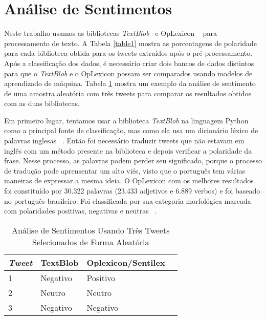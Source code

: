 \section{Análise de Sentimentos}

Neste trabalho usamos as bibliotecas \textit{TextBlob} ~\cite{textblob}e OpLexicon
~\cite{souza} para processamento de texto. A Tabela \ref{table1} mostra as
porcentagens de polaridade para cada biblioteca obtida para
os tweets extraídos após o pré-processamento.
Após a classificação dos dados, é necessário criar dois
bancos de dados distintos para que o \textit{TextBlob} e o OpLexicon
possam ser comparados usando modelos de aprendizado de
máquina. Tabela \ref{table2} mostra um exemplo da análise de sentimento
de uma amostra aleatória com três tweets para comparar
os resultados obtidos com as duas bibliotecas.


Em primeiro lugar, tentamos usar a biblioteca \textit{TextBlob} na
linguagem Python como a principal fonte de classificação,
mas como ela usa um dicionário léxico de palavras inglesas
~\cite{miller1995wordnet}. Então foi necessário traduzir tweets que não estavam em
inglês com um método presente na biblioteca e depois verificar
a polaridade da frase. Nesse processo, as palavras podem
perder seu significado, porque o processo de tradução pode
aprensentar um alto viés, visto que o português tem várias maneiras de expressar a mesma ideia.
O OpLexicon com os melhores resultados foi constituído
por 30.322 palavras (23.433 adjetivos e 6.889 verbos) e foi
baseado no português brasileiro. Foi classificada por sua
categoria morfológica marcada com polaridades positivas,
negativas e neutras ~\cite{souza2011construction}.


    \begin{table}
        \centering
        \caption{Análise de Sentimentos Usando Três Tweets Selecionados de Forma Aleatória\\}
        \label{table2}
        \begin{tabular}{llll}
        \hline
        \textit{Tweet}          & TextBlob & Oplexicon/Sentilex \\ \hline
        1  & Negativo & Positivo  \\ \hline
        2& Neutro  & Neutro  \\ \hline
        3& Negativo  & Negativo  \\ \hline
        \end{tabular}
        \end{table}



